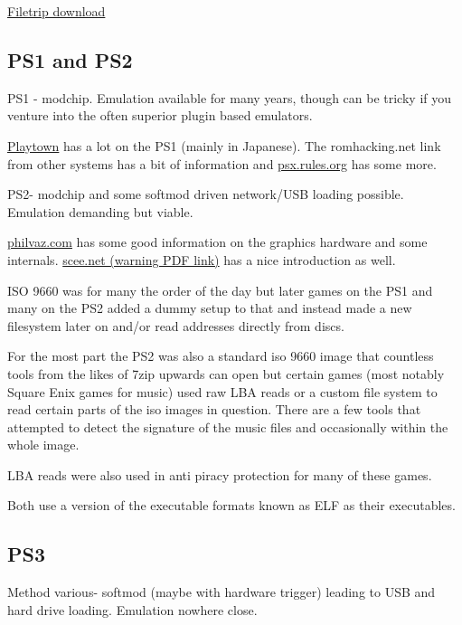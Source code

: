\documentclass[
]{book}
\begin{document}
\href{http://filetrip.net/360-downloads/hdd-tools/download-usb-xtaf-xplorer-44-f23780.html}{Filetrip download}

\hypertarget{ps1-and-ps2}{%
\subsection{PS1 and PS2}\label{ps1-and-ps2}}

PS1 - modchip. Emulation available for many years, though can be tricky if you venture into the often superior plugin based emulators.

\href{http://www.geocities.co.jp/Playtown/2004/psx/}{Playtown} has a lot on the PS1 (mainly in Japanese). The romhacking.net link from other systems has a bit of information and \href{http://psx.rules.org/psxrul2.shtml}{psx.rules.org} has some more.

PS2- modchip and some softmod driven network/USB loading possible. Emulation demanding but viable.

\href{http://www.philvaz.com/games/PS2.htm}{philvaz.com} has some good information on the graphics hardware and some internals. \href{http://research.scee.net/files/presentations/agdc2002/PS2forPCprogrammers.pdf}{scee.net (warning PDF link)} has a nice introduction as well.

ISO 9660 was for many the order of the day but later games on the PS1 and many on the PS2 added a dummy setup to that and instead made a new filesystem later on and/or read addresses directly from discs.

For the most part the PS2 was also a standard iso 9660 image that countless tools from the likes of 7zip upwards can open but certain games (most notably Square Enix games for music) used raw LBA reads or a custom file system to read certain parts of the iso images in question. There are a few tools that attempted to detect the signature of the music files and occasionally within the whole image.

LBA reads were also used in anti piracy protection for many of these games.

Both use a version of the executable formats known as ELF as their executables.

\hypertarget{ps3}{%
\subsection{PS3}\label{ps3}}

Method various- softmod (maybe with hardware trigger) leading to USB and hard drive loading. Emulation nowhere close.
\end{document}

